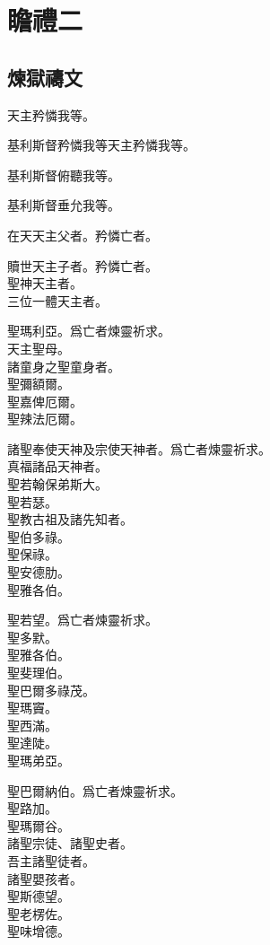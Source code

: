 \chapter[瞻禮二]{瞻禮二}
\section{煉獄禱文}
\versicle 天主矜憐我等。

\Response 基利斯督矜憐我等\hfill 天主矜憐我等。

\versicle 基利斯督俯聽我等。

\Response 基利斯督垂允我等。

\versicle 在天天主父者。\hfill \response 矜憐亡者。

\versicle 贖世天主子者。\hfill \response 矜憐亡者。\\
聖神天主者。\\
三位一體天主者。

\versicle 聖瑪利亞。\hfill \response 爲亡者煉靈祈求。\\
天主聖母。\\
諸童身之聖童身者。\\
聖彌額爾。\\
聖嘉俾厄爾。\\
聖辣法厄爾。

\versicle 諸聖奉使天神及宗使天神者。\hfill \response 爲亡者煉靈祈求。\\
真福諸品天神者。\\
聖若翰保弟斯大。\\
聖若瑟。\\
聖教古祖及諸先知者。\\
聖伯多祿。\\
聖保祿。\\
聖安德肋。\\
聖雅各伯。

\versicle 聖若望。\hfill \response 爲亡者煉靈祈求。\\
聖多默。\\
聖雅各伯。\\
聖斐理伯。\\
聖巴爾多祿茂。\\
聖瑪竇。\\
聖西滿。\\
聖達陡。\\
聖瑪弟亞。

\versicle 聖巴爾納伯。\hfill \response 爲亡者煉靈祈求。\\
聖路加。\\
聖瑪爾谷。\\
諸聖宗徒、諸聖史者。\\
吾主諸聖徒者。\\
諸聖嬰孩者。\\
聖斯德望。\\
聖老楞佐。\\
聖味增德。

